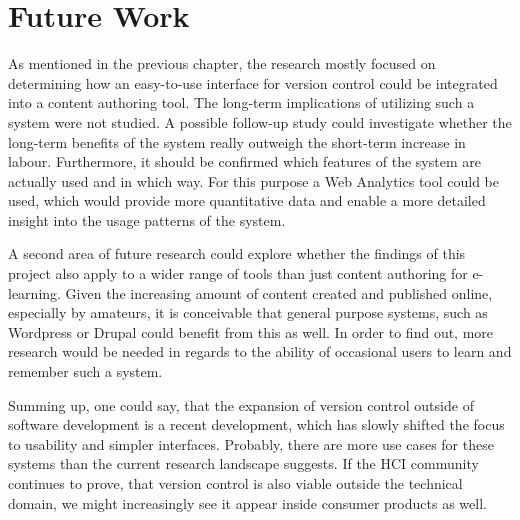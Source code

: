 \chapter{Future Work} \label{chapter:future-work}
As mentioned in the previous chapter, the research mostly focused on determining how an easy-to-use interface for version control could be integrated into a content authoring tool. The long-term implications of utilizing such a system were not studied. A possible follow-up study could investigate whether the long-term benefits of the system really outweigh the short-term increase in labour. Furthermore, it should be confirmed which features of the system are actually used and in which way. For this purpose a Web Analytics tool could be used, which would provide more quantitative data and enable a more detailed insight into the usage patterns of the system.

A second area of future research could explore whether the findings of this project also apply to a wider range of tools than just content authoring for e-learning. Given the increasing amount of content created and published online, especially by amateurs, it is conceivable that general purpose systems, such as Wordpress \cite{_wordpress_????} or Drupal \cite{_drupal_????} could benefit from this as well. In order to find out, more research would be needed in regards to the ability of occasional users to learn and remember such a system.

Summing up, one could say, that the expansion of version control outside of software development is a recent development, which has slowly shifted the focus to usability and simpler interfaces. Probably, there are more use cases for these systems than the current research landscape suggests. If the HCI community continues to prove, that version control is also viable outside the technical domain, we might increasingly see it appear inside consumer products as well.









